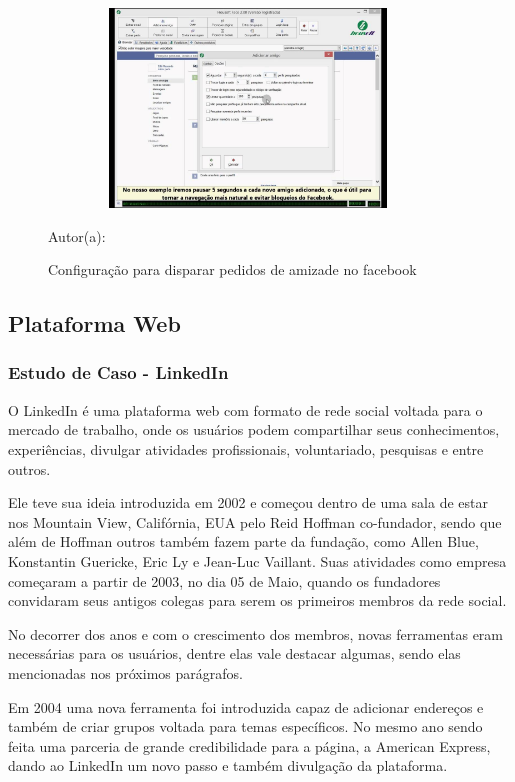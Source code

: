 \begin{figure}[!h]
	\centering
	\caption{Configuração para disparar pedidos de amizade no facebook}
	\includegraphics[width=400px, height=200px]{./images/housoft1.jpg}
	\par {Autor(a): \cite{housoft}}
\end{figure}

\newpage

\subsection{Plataforma Web}

\subsubsection{Estudo de Caso - LinkedIn}

O LinkedIn é uma plataforma web com formato de rede social voltada para o mercado de trabalho, onde os usuários podem compartilhar seus conhecimentos, experiências, divulgar atividades profissionais, voluntariado, pesquisas e entre outros. 

Ele teve sua ideia introduzida em 2002 e começou dentro de uma sala de estar nos Mountain View, Califórnia, EUA pelo Reid Hoffman co-fundador, sendo que além de Hoffman outros também fazem parte da fundação, como Allen Blue, Konstantin Guericke, Eric Ly e Jean-Luc Vaillant. Suas atividades como empresa começaram a partir de 2003, no dia 05 de Maio, quando os fundadores convidaram seus antigos colegas para serem os primeiros membros da rede social.

No decorrer dos anos e com o crescimento dos membros, novas ferramentas eram necessárias para os usuários, dentre elas vale destacar algumas, sendo elas mencionadas nos próximos parágrafos.

Em 2004 uma nova ferramenta foi introduzida capaz de adicionar endereços e também de criar grupos voltada para temas específicos. No mesmo ano sendo feita uma parceria de grande credibilidade para a página, a American Express, dando ao LinkedIn um novo passo e também divulgação da plataforma. 

